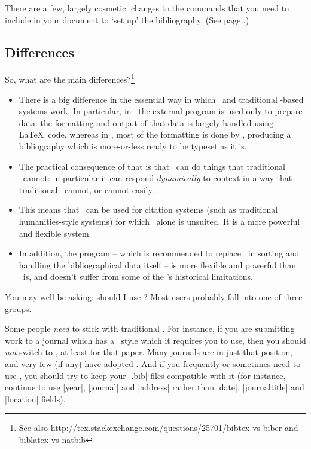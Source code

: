 There are a few, largely cosmetic, changes to the commands that you
need to include in your document to `set up' the bibliography. (See
page \pageref{bibtex:simple:eg}.)

\subsection{Differences}

So, what are the main differences?\footnote{See also \url{http://tex.stackexchange.com/questions/25701/bibtex-vs-biber-and-biblatex-vs-natbib}}
\begin{itemize}
\item There is a big difference in the essential way in which
  \biblatex\ and traditional \bibtex-based systems work. In
  particular, in \biblatex\ the external program is used only to
  prepare data: the formatting and output of that data is largely
  handled using \LaTeX\ code, whereas in \bibtex, most of the
  formatting is done by \bibtex, producing a bibliography which is
  more-or-less ready to be typeset as it is.
\item The practical consequence of that is that \biblatex\ can do
  things that traditional \bibtex\ cannot: in particular it can
  respond \emph{dynamically} to context in a way that traditional
  \bibtex\ cannot, or cannot easily.
\item This means that \biblatex\ can be used for citation systems
  (such as traditional humanities-style systems) for which \bibtex\
  alone is unsuited. It is a more powerful and flexible system.
\item In addition, the  program -- which is recommended
  to replace \bibtex\ in sorting and handling the bibliographical data
  itself -- is more flexible and powerful than \bibtex\ is, and
  doesn't suffer from some of the \bibtex's historical limitations.
\end{itemize}

You may well be asking: should I use \biblatex? Most users probably
fall into one of three groups.

Some people \emph{need} to stick with traditional \bibtex. For
instance, if you are submitting work to a journal which has a \bibtex\
style which it requires you to use, then you should \emph{not} switch
to \biblatex, at least for that paper. Many journals are in just that
position, and very few (if any) have adopted \biblatex. And if you
frequently or sometimes need to use \bibtex, you should try to keep
your |.bib| files compatible with it (for instance, continue to use
|year|, |journal| and |address| rather than |date|, |journaltitle| and
|location| fields).

